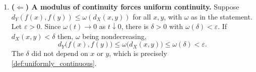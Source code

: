 \begin{exercisesolution}
\label{sol:moduli_of_continuity}
\begin{enumerate}[label=\textbf{(\alph*)}]
  \item \textbf{($\Leftarrow$) A modulus of continuity forces uniform continuity.} Suppose
    $d_Y(f(x),f(y)) \leq \omega(d_X(x,y))$ for all $x,y$, with $\omega$ as in the statement. Let
    $\varepsilon > 0$. Since $\omega(t) \to 0$ as $t \downarrow 0$, there is $\delta > 0$ with
    $\omega(\delta) < \varepsilon$. If $d_X(x,y) < \delta$ then, $\omega$ being nondecreasing,
    \[d_Y\big(f(x),f(y)\big) \leq \omega\big(d_X(x,y)\big) \leq \omega(\delta) < \varepsilon.\]
    The $\delta$ did not depend on $x$ or $y$, which is precisely
    \cref{def:uniformly_continuous}.


\end{enumerate}
\end{exercisesolution}
